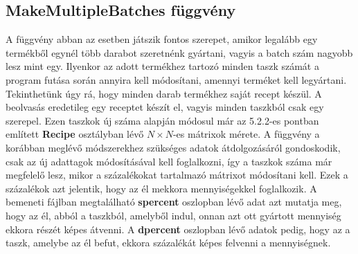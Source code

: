 \subsection{MakeMultipleBatches függvény}
A függvény abban az esetben játszik fontos szerepet, amikor legalább egy termékből egynél több darabot szeretnénk gyártani, vagyis a batch szám nagyobb lesz mint egy. Ilyenkor az adott termékhez tartozó minden taszk számát a program futása során annyira kell módosítani, amennyi terméket kell legyártani. Tekinthetünk úgy rá, hogy minden darab termékhez saját recept készül. A beolvasás eredetileg egy receptet készít el, vagyis minden taszkból csak egy szerepel. Ezen taszkok új száma alapján módosul már az 5.2.2-es pontban említett \textbf{Recipe} osztályban lévő $N\times N$-es mátrixok mérete. A függvény a korábban meglévő módszerekhez szükséges adatok átdolgozásáról gondoskodik, csak az új adattagok módosításával kell foglalkozni, így a taszkok száma már megfelelő lesz, mikor a százalékokat tartalmazó mátrixot módosítani kell. Ezek a százalékok azt jelentik, hogy az él mekkora mennyiségekkel foglalkozik. A bemeneti fájlban megtalálható \textbf{s\textunderscore percent} oszlopban lévő adat azt mutatja meg, hogy az él, abból a taszkból, amelyből indul, onnan azt ott gyártott mennyiség ekkora részét képes átvenni. A \textbf{d\textunderscore percent} oszlopban lévő adatok pedig, hogy az a taszk, amelybe az él befut, ekkora százalékát képes felvenni a mennyiségnek. 

